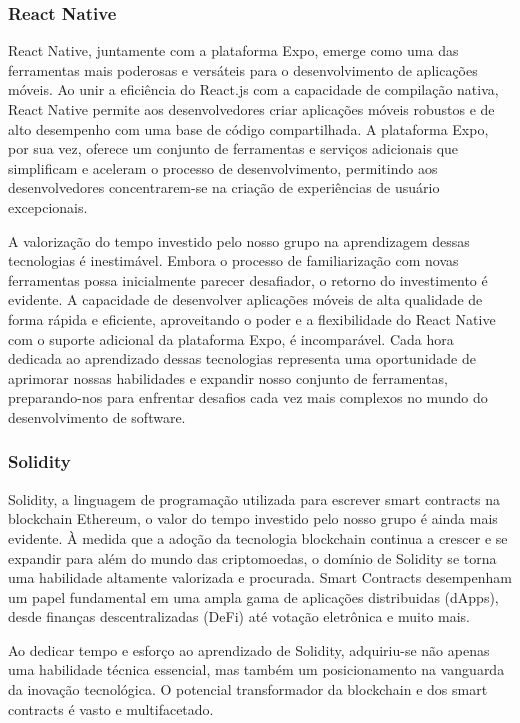 \documentclass[10pt]{article}
\begin{document}
\subsubsection*{React Native}

React Native, juntamente com a plataforma Expo, emerge como uma das ferramentas mais poderosas e versáteis
para o desenvolvimento de aplicações móveis. Ao unir a eficiência do React.js com a capacidade de compilação
nativa, React Native permite aos desenvolvedores criar aplicações móveis robustos e de alto desempenho
com uma base de código compartilhada. A plataforma Expo, por sua vez, oferece um conjunto de ferramentas
e serviços adicionais que simplificam e aceleram o processo de desenvolvimento, permitindo aos desenvolvedores
concentrarem-se na criação de experiências de usuário excepcionais.

A valorização do tempo investido pelo nosso grupo na aprendizagem dessas tecnologias é inestimável.
Embora o processo de familiarização com novas ferramentas possa inicialmente parecer desafiador,
o retorno do investimento é evidente. A capacidade de desenvolver aplicações móveis de alta qualidade
de forma rápida e eficiente, aproveitando o poder e a flexibilidade do React Native com o suporte
adicional da plataforma Expo, é incomparável. Cada hora dedicada ao aprendizado dessas tecnologias
representa uma oportunidade de aprimorar nossas habilidades e expandir nosso conjunto de ferramentas,
preparando-nos para enfrentar desafios cada vez mais complexos no mundo do desenvolvimento de software.

\subsubsection*{Solidity}

Solidity, a linguagem de programação utilizada para escrever smart contracts na blockchain Ethereum,
o valor do tempo investido pelo nosso grupo é ainda mais evidente. À medida que a adoção da tecnologia
blockchain continua a crescer e se expandir para além do mundo das criptomoedas, o domínio de Solidity se
torna uma habilidade altamente valorizada e procurada. Smart Contracts desempenham um papel fundamental em
uma ampla gama de aplicações distribuidas (dApps), desde finanças descentralizadas (DeFi) até votação eletrônica
e muito mais.

Ao dedicar tempo e esforço ao aprendizado de Solidity, adquiriu-se não apenas uma habilidade técnica essencial,
mas também um posicionamento na vanguarda da inovação tecnológica. O potencial transformador da blockchain e dos
smart contracts é vasto e multifacetado.
\end{document}
